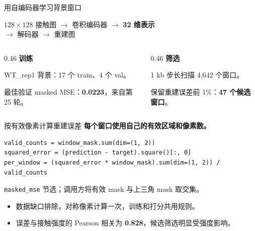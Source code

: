 \begin{frame}{用自编码器学习背景窗口}
\begin{center}
$128\times128$ 接触图 $\longrightarrow$ 卷积编码器 $\longrightarrow$ \textbf{32 维表示}\\[0.7em]
$\longrightarrow$ 解码器 $\longrightarrow$ 重建图
\end{center}
\vspace{0.9em}
\begin{columns}[T,onlytextwidth]
\begin{column}{0.46\textwidth}
\textcolor{projectblue}{\large\textbf{训练}}\par\vspace{0.5em}
WT\_rep1 背景：17 个 train、4 个 val。\par\vspace{0.5em}
最佳验证 masked MSE：\textbf{0.0223}，来自第 25 轮。
\end{column}
\begin{column}{0.46\textwidth}
\textcolor{projectblue}{\large\textbf{筛选}}\par\vspace{0.5em}
1 kb 步长扫描 4,642 个窗口。\par\vspace{0.5em}
保留重建误差前 1\%：\textbf{47 个候选窗口}。
\end{column}
\end{columns}
\end{frame}

\begin{frame}[fragile]{按有效像素计算重建误差}
\textbf{每个窗口使用自己的有效区域和像素数。}
\vspace{0.6em}
\begin{lstlisting}
valid_counts = window_mask.sum(dim=(1, 2))
squared_error = (prediction - target).square()[:, 0]
per_window = (squared_error * window_mask).sum(dim=(1, 2)) / valid_counts
\end{lstlisting}
\small \texttt{masked\_mse} 节选；调用方将有效 mask 与上三角 mask 取交集。\par
\vspace{0.6em}
\begin{itemize}
\item 数据缺口排除，对称像素计算一次，训练和打分共用规则。
\item 误差与接触强度的 Pearson 相关为 \textbf{0.828}，候选筛选明显受强度影响。
\end{itemize}
\end{frame}

